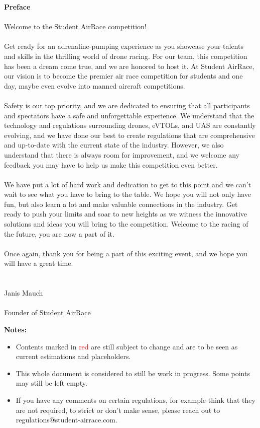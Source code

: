 \documentclass{article}
\begin{document}
\newpage
{\bf Preface}
\\ \\ Welcome to the Student AirRace competition! \\ \\
Get ready for an adrenaline-pumping experience as you showcase your talents and skills in the thrilling world of drone racing. 
For our team, this competition has been a dream come true, and we are honored to host it. 
At Student AirRace, our vision is to become the premier air race competition for students and one day, maybe even evolve into manned aircraft competitions.
\\ \\ 
Safety is our top priority, and we are dedicated to ensuring that all participants and spectators have a safe and unforgettable experience. 
We understand that the technology and regulations surrounding drones, eVTOLs, and UAS are constantly evolving, and we have done our best to create regulations that are comprehensive and up-to-date with the current state of the industry. 
However, we also understand that there is always room for improvement, and we welcome any feedback you may have to help us make this competition even better.
\\ \\ 
We have put a lot of hard work and dedication to get to this point and we can't wait to see what you have to bring to the table. 
We hope you will not only have fun, but also learn a lot and make valuable connections in the industry. 
Get ready to push your limits and soar to new heights as we witness the innovative solutions and ideas you will bring to the competition. 
Welcome to the racing of the future, you are now a part of it.
\\ \\ 
Once again, thank you for being a part of this exciting event, and we hope you will have a great time.
\\ \\ \\
Janis Mauch 
\\ \\Founder of Student AirRace


\newpage
{\bf Notes:
\begin{itemize}
  \item Contents marked in \textcolor{red}{red} are still subject to change and are to be seen as current estimations and placeholders.
  \item This whole document is considered to still be work in progress. Some points may still be left empty.
  \item If you have any comments on certain regulations, for example think that they are not required, to strict or don't make sense, please reach out to regulations@student-airrace.com.
\end{itemize}
}
\hspace{10mm}
\end{document}
